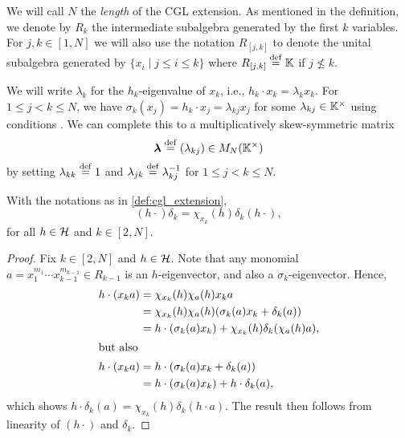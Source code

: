 We will call $N$ the \emph{length} of the CGL extension.
As mentioned in the definition, we denote by $R_k$ the intermediate
subalgebra generated by the first $k$ variables. For $j, k \in [1, N]$ we will also use
the notation $R_{[j, k]}$ to denote the unital subalgebra
generated by $\{x_i \mid j \leq i \leq k\}$ where $R_{[j, k]} \overset{\mathrm{def}}{=} \mathbb{K}$ if $j \nleq
	k$.

We will write $\lambda_k$ for the $h_k$-eigenvalue of $x_k$, i.e., $h_k \cdot x_k =
	\lambda_k x_k$. For $1 \leq j < k \leq N$, we have
$\sigma_k (x_j) = h_k \cdot x_j = \lambda_{kj} x_j$ for some $\lambda_{kj} \in
	\mathbb{K}^\times$ using conditions . We
can complete this to a multiplicatively skew-symmetric matrix
\begin{equation}\label{eq:CGL_lambda}
	\boldsymbol{\lambda} \overset{\mathrm{def}}{=} (\lambda_{kj}) \in M_N(\mathbb{K}^\times)
\end{equation}
%
 by setting $\lambda_{kk} \overset{\mathrm{def}}{=} 1$ and $\lambda_{jk} \overset{\mathrm{def}}{=} \lambda_{kj}^{-1}$ for $1 \leq j < k
	\leq N$.

\begin{lemma}\label{lem:h_after_delta}
	With the notations as in \cref{def:cgl_extension},
	\begin{equation*}
		(h\cdot )\delta_k = \chi_{x_k}(h)\delta_k(h\cdot),
	\end{equation*}
	for all $h \in \mathcal{H}$ and $k \in [2, N]$.
\end{lemma}
\begin{proof}
	Fix $k \in [2, N]$ and $h \in \mathcal{H}$. Note that any monomial $a = x_1^{m_1}\cdots x_{k-1}^{m_{k-1}} \in R_{k-1}$ is an $h$-eigenvector, and also a $\sigma_k$-eigenvector. Hence,
	\begin{align*}
		h \cdot(x_k a)  & = \chi_{x_k}(h)\chi_{a}(h)x_ka                                      \\
		                & = \chi_{x_k}(h)\chi_{a}(h)(\sigma_k (a)x_k +  \delta_k(a))          \\
		                & = h \cdot (\sigma_k (a) x_k) + \chi_{x_k}(h)\delta_k(\chi_{a}(h)a), \\
		\shortintertext{but also}
		h \cdot (x_k a) & = h \cdot (\sigma_k (a) x_k + \delta_k(a))                          \\
		                & = h \cdot (\sigma_k (a) x_k) + h\cdot \delta_k(a),
	\end{align*}
	which shows $h \cdot \delta_k (a) = \chi_{x_k}(h) \delta_k (h \cdot a)$. The result then follows from linearity of $(h \cdot)$ and $\delta_k$.
\end{proof}

